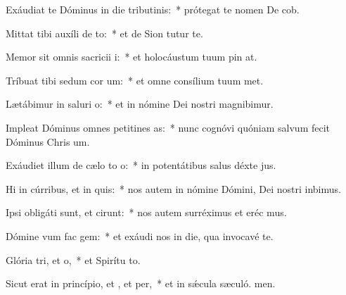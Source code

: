 \item Exáudiat te Dóminus in die tributinis:~* prótegat te nomen De cob.
\item Mittat tibi auxíli de to:~* et de Sion tutur te.
\item Memor sit omnis sacricii i:~* et holocáustum tuum pin at.
\item Tríbuat tibi sedum cor um:~* et omne consílium tuum met.
\item Lætábimur in saluri o:~* et in nómine Dei nostri magnibimur.
\item Impleat Dóminus omnes petitines as:~* nunc cognóvi quóniam salvum fecit Dóminus Chris um.
\item Exáudiet illum de cælo to o:~* in potentátibus salus déxte jus.
\item Hi in cúrribus, et  in quis:~* nos autem in nómine Dómini, Dei nostri inbimus.
\item Ipsi obligáti sunt, et cirunt:~* nos autem surréximus et eréc mus.
\item Dómine vum fac gem:~* et exáudi nos in die, qua invocavé te.
\item Glória tri, et o,~* et Spirítu to.
\item Sicut erat in princípio, et , et per,~* et in sǽcula sæculó. men.

